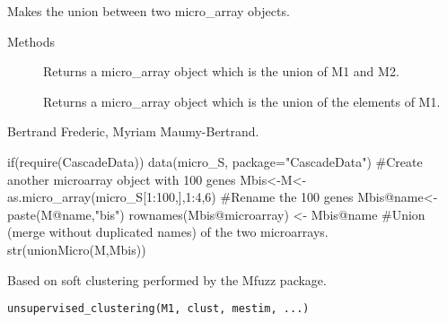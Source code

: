 \documentclass[a4paper]{book}
\begin{document}
%
\begin{Description}\relax
Makes the union between two micro\_array objects.
\end{Description}
%
\begin{Section}{Methods}
\begin{description}


\item[] 
Returns a micro\_array object which is the union of M1 and M2. 


\item[] 
Returns a micro\_array object which is the union of the elements of M1. 


\end{description}
\end{Section}
%
\begin{Author}\relax
Bertrand Frederic, Myriam Maumy-Bertrand.
\end{Author}
%
\begin{Examples}
\begin{ExampleCode}
if(require(CascadeData)){
data(micro_S, package="CascadeData")
#Create another microarray object with 100 genes
Mbis<-M<-as.micro_array(micro_S[1:100,],1:4,6)
#Rename the 100 genes
Mbis@name<-paste(M@name,"bis")
rownames(Mbis@microarray) <- Mbis@name
#Union (merge without duplicated names) of the two microarrays. 
str(unionMicro(M,Mbis))
}
\end{ExampleCode}
\end{Examples}
%
\begin{Description}\relax
Based on soft clustering performed by the Mfuzz package.
\end{Description}
%
\begin{Usage}
\begin{verbatim}
unsupervised_clustering(M1, clust, mestim, ...)
\end{verbatim}
\end{Usage}
\end{document}
